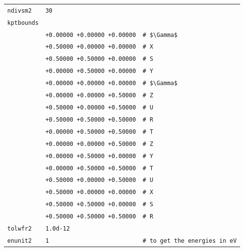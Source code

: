 \documentclass[11pt,a4paper]{article}
\begin{document}
\begin{center}
\begin{tabular}{lll}
\texttt{ndivsm2}&\texttt{30}&\\
\texttt{kptbounds}&&\\
&\texttt{+0.00000 +0.00000 +0.00000}&\texttt{\# \$\textbackslash Gamma\$}\\
&\texttt{+0.50000  +0.00000  +0.00000}&\texttt{\# X}\\
&\texttt{+0.50000  +0.50000  +0.00000}&\texttt{\# S}\\
&\texttt{+0.00000  +0.50000  +0.00000}&\texttt{\# Y}\\
&\texttt{+0.00000  +0.00000  +0.00000}&\texttt{\# \$\textbackslash Gamma\$}\\
&\texttt{+0.00000  +0.00000  +0.50000}&\texttt{\# Z}\\
&\texttt{+0.50000  +0.00000  +0.50000}&\texttt{\# U}\\
&\texttt{+0.50000  +0.50000  +0.50000}&\texttt{\# R}\\
&\texttt{+0.00000  +0.50000  +0.50000}&\texttt{\# T}\\
&\texttt{+0.00000  +0.00000  +0.50000}&\texttt{\# Z}\\
&\texttt{+0.00000  +0.50000  +0.00000}&\texttt{\# Y}\\
&\texttt{+0.00000  +0.50000  +0.50000}&\texttt{\# T}\\
&\texttt{+0.50000  +0.00000  +0.50000}&\texttt{\# U}\\
&\texttt{+0.50000  +0.00000  +0.00000}&\texttt{\# X}\\
&\texttt{+0.50000  +0.50000  +0.00000}&\texttt{\# S}\\
&\texttt{+0.50000  +0.50000  +0.50000}&\texttt{\# R}\\
\texttt{tolwfr2}&\texttt{1.0d-12}&\\
\texttt{enunit2}&\texttt{1}&\texttt{\# to get the energies in eV}\\
\end{tabular}
\end{center}
\newpage
\end{document}
